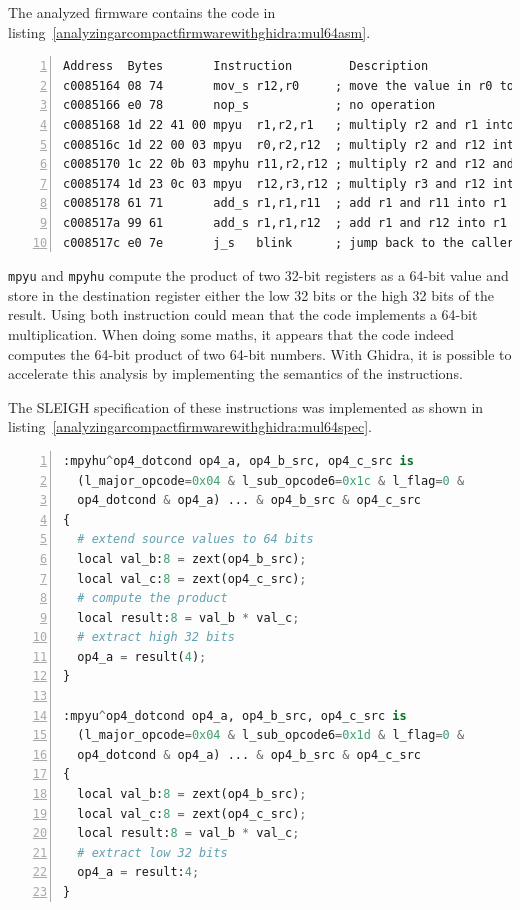 The analyzed firmware contains the code in
listing~\ref{analyzingarcompactfirmwarewithghidra:mul64asm}.

\begin{lstlisting}[numbers=left, caption={Assembly code containing multiplication instructions}, label=analyzingarcompactfirmwarewithghidra:mul64asm]
Address  Bytes       Instruction        Description
c0085164 08 74       mov_s r12,r0     ; move the value in r0 to r12
c0085166 e0 78       nop_s            ; no operation
c0085168 1d 22 41 00 mpyu  r1,r2,r1   ; multiply r2 and r1 into r1
c008516c 1d 22 00 03 mpyu  r0,r2,r12  ; multiply r2 and r12 into r0
c0085170 1c 22 0b 03 mpyhu r11,r2,r12 ; multiply r2 and r12 and store the high 32 bits in r11
c0085174 1d 23 0c 03 mpyu  r12,r3,r12 ; multiply r3 and r12 into r12
c0085178 61 71       add_s r1,r1,r11  ; add r1 and r11 into r1
c008517a 99 61       add_s r1,r1,r12  ; add r1 and r12 into r1
c008517c e0 7e       j_s   blink      ; jump back to the caller
\end{lstlisting}

\texttt{mpyu} and \texttt{mpyhu}
compute the product of two 32-bit registers as a 64-bit value and store
in the destination register either the low 32 bits or the high 32 bits
of the result. Using both instruction could mean that the code
implements a 64-bit multiplication. When doing some maths, it appears
that the code indeed computes the 64-bit product of two 64-bit numbers.
With Ghidra, it is possible to accelerate this analysis by implementing
the semantics of the instructions.

The SLEIGH specification of these instructions was implemented as shown
in listing~\ref{analyzingarcompactfirmwarewithghidra:mul64spec}.

\begin{lstlisting}[language=Python, numbers=left, caption={SLEIGH specification of instructions \texttt{mpyu} and \texttt{mpyhu}}, label=analyzingarcompactfirmwarewithghidra:mul64spec]
:mpyhu^op4_dotcond op4_a, op4_b_src, op4_c_src is
  (l_major_opcode=0x04 & l_sub_opcode6=0x1c & l_flag=0 &
  op4_dotcond & op4_a) ... & op4_b_src & op4_c_src
{
  # extend source values to 64 bits
  local val_b:8 = zext(op4_b_src);
  local val_c:8 = zext(op4_c_src);
  # compute the product
  local result:8 = val_b * val_c;
  # extract high 32 bits
  op4_a = result(4);
}

:mpyu^op4_dotcond op4_a, op4_b_src, op4_c_src is
  (l_major_opcode=0x04 & l_sub_opcode6=0x1d & l_flag=0 &
  op4_dotcond & op4_a) ... & op4_b_src & op4_c_src
{
  local val_b:8 = zext(op4_b_src);
  local val_c:8 = zext(op4_c_src);
  local result:8 = val_b * val_c;
  # extract low 32 bits
  op4_a = result:4;
}
\end{lstlisting}

